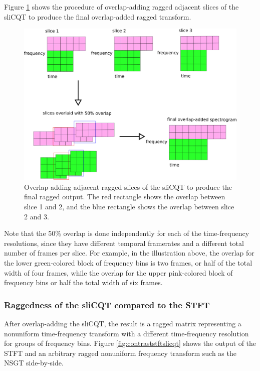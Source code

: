 \documentclass[report.tex]{subfiles}
\begin{document}
Figure \ref{fig:raggedslicqtoverlapadd} shows the procedure of overlap-adding ragged adjacent slices of the sliCQT to produce the final overlap-added ragged transform.

\begin{figure}[ht]
	\centering
	\includegraphics[width=\textwidth]{./images-blockdiagrams/overlapprocess.png}
	\caption{Overlap-adding adjacent ragged slices of the sliCQT to produce the final ragged output. The red rectangle shows the overlap between slice 1 and 2, and the blue rectangle shows the overlap between slice 2 and 3.}
	\label{fig:raggedslicqtoverlapadd}
\end{figure}

Note that the 50\% overlap is done independently for each of the time-frequency resolutions, since they have different temporal framerates and a different total number of frames per slice. For example, in the illustration above, the overlap for the lower green-colored block of frequency bins is two frames, or half of the total width of four frames, while the overlap for the upper pink-colored block of frequency bins or half the total width of six frames.

\subsubsection{Raggedness of the sliCQT compared to the STFT}
\label{sec:stftslicqtcomp2}

After overlap-adding the sliCQT, the result is a ragged matrix representing a nonuniform time-frequency transform with a different time-frequency resolution for groups of frequency bins. Figure \ref{fig:contraststftslicqt} shows the output of the STFT and an arbitrary ragged nonuniform frequency transform such as the NSGT side-by-side.
\end{document}
